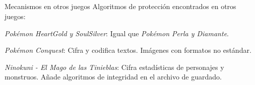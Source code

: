 \subsection{}
\begin{frame}{Mecanismos en otros juegos}
Algoritmos de protección encontrados en otros juegos:

\begin{wideitemize}
    \item<+-> \textit{Pokémon HeartGold y SoulSilver}: Igual que \textit{Pokémon Perla y Diamante}.

    \item<+-> \textit{Pokémon Conquest}: Cifra y codifica textos. Imágenes con formatos no estándar.

    \item <+-> \textit{Ninokuni - El Mago de las Tinieblas}: Cifra estadísticas de personajes y monstruos. Añade algoritmos de integridad en el archivo de guardado.
\end{wideitemize}
\end{frame}
